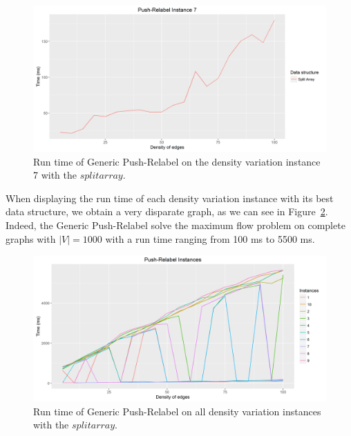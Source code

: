 \begin{figure}[H]
\begin{center}
\includegraphics[scale=0.5]{images/pri7.png}
\caption{Run time of Generic Push-Relabel on the density variation instance 7 with the $split array$.}
\label{fig:PR7}
\end{center}
\end{figure}
When displaying the run time of each density variation instance with its best data structure, we obtain a very disparate graph, as we can see in Figure~\ref{fig:PRmean}. Indeed, the Generic Push-Relabel solve the maximum flow problem on complete graphs with $|V|=1000$ with a run time ranging from 100 ms to 5500 ms.
\begin{figure}[H]
\begin{center}
\includegraphics[scale=0.5]{images/PRmean.png}
\caption{Run time of Generic Push-Relabel on all density variation instances with the $split array$.}
\label{fig:PRmean}
\end{center}
\end{figure}
